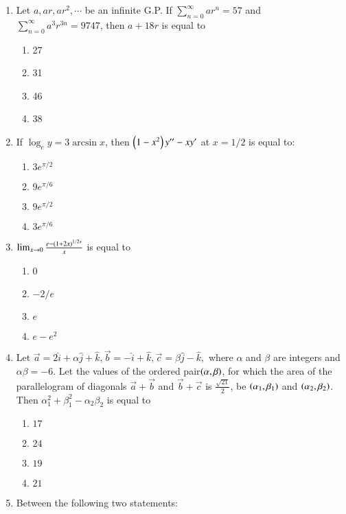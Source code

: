 \documentclass[journal]{IEEEtran}
\numberwithin{equation}{enumi}
\numberwithin{figure}{enumi}
\begin{document}
\begin{enumerate}
\begin{enumerate}
    \end{enumerate}
    \item Let $a,ar,ar^2,\cdots$ be an infinite G.P. If $\sum_{n=0}^{\infty}ar^n=57$ and $\sum_{n=0}^{\infty}a^3r^{3n}=9747$, then $a+18r$ is equal to 
    \begin{enumerate}
    	\item 27
    	\item 31
    	\item 46
    	\item 38
    \end{enumerate}
    \item If $\log_e y = 3\arcsin{x}$, then $\left(1-x^2\right)y^{\prime\prime}-xy^{\prime}$ at $x = 1/2$ is equal to:
    \begin{enumerate}
        \item $3e^{\pi/2}$
        \item $9e^{\pi/6}$
        \item $9e^{\pi/2}$
        \item $3e^{\pi/6}$
    \end{enumerate}
    \item $\lim_{x \to 0} \frac{e-\left(1+2x\right)^{1/2x}}{x}$ is equal to
    \begin{enumerate}
        \item 0
        \item $-2/e$
        \item $e$
        \item $e-e^2$
    \end{enumerate}
    \item Let $\vec{a} = 2\hat{i} + \alpha\hat{j} + \hat{k}, \vec{b} = -\hat{i} + \hat{k}, \vec{c}=\beta\hat{j}-\hat{k},$ where $\alpha$ and $\beta$ are integers and $\alpha\beta=-6$. Let the values of the ordered pair$\left(\alpha,\beta\right)$, for which the area of the parallelogram of diagonals $\vec{a}+\vec{b}$ and $\vec{b}+\vec{c}$ is $\frac{\sqrt{21}}{2}$, be $\left(\alpha_1,\beta_1\right)$ and $\left(\alpha_2,\beta_2\right)$. Then $\alpha_1^2+\beta_1^2-\alpha_2\beta_2$ is equal to
    \begin{enumerate}
        \item $17$
        \item $24$
        \item $19$
        \item $21$
    \end{enumerate}
    \item Between the following two statements:\\

\end{enumerate}
\end{document}
